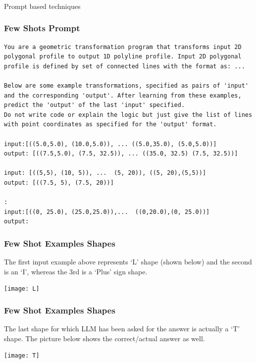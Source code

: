 \begin{frame}[fragile]\frametitle{}
\begin{center}
{\Large Prompt based techniques}
\end{center}
\end{frame}


\begin{frame}[fragile]\frametitle{Few Shots Prompt}
\begin{lstlisting}
You are a geometric transformation program that transforms input 2D polygonal profile to output 1D polyline profile. Input 2D polygonal profile is defined by set of connected lines with the format as: ...

Below are some example transformations, specified as pairs of 'input' and the corresponding 'output'. After learning from these examples, predict the 'output' of the last 'input' specified.
Do not write code or explain the logic but just give the list of lines with point coordinates as specified for the 'output' format.

input:[((5.0,5.0), (10.0,5.0)), ... ((5.0,35.0), (5.0,5.0))]
output: [((7.5,5.0), (7.5, 32.5)), ... ((35.0, 32.5) (7.5, 32.5))]

input: [((5,5), (10, 5)), ...  (5, 20)), ((5, 20),(5,5))]
output: [((7.5, 5), (7.5, 20))]

:
input:[((0, 25.0), (25.0,25.0)),...  ((0,20.0),(0, 25.0))]
output:
\end{lstlisting}	
\end{frame}

\begin{frame}[fragile]\frametitle{Few Shot Examples Shapes}
The first input example above represents ‘L’ shape (shown below) and the second is an ‘I’, whereas the 3rd is a ‘Plus’ sign shape.

\begin{center}
\texttt{[image: L]}
\end{center}	
\end{frame}

\begin{frame}[fragile]\frametitle{Few Shot Examples Shapes}
The last shape for which LLM has been asked for the answer is actually a ‘T’ shape. The picture below shows the correct/actual answer as well.

\begin{center}
\texttt{[image: T]}
\end{center}	
\end{frame}

